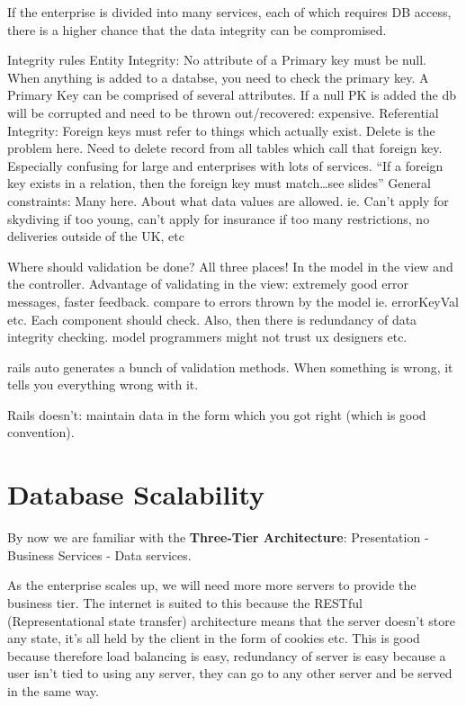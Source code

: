 \documentclass[11pt]{article}
\begin{document}
If the enterprise is divided into many services, each of which requires DB access, there is a higher chance that the data integrity can be compromised.

Integrity rules
Entity Integrity: No attribute of a Primary key must be null. When anything is added to a databse, you need to check the primary key. A Primary Key can be comprised of several attributes. If a null PK is added the db will be corrupted and need to be thrown out/recovered: expensive.
Referential Integrity: Foreign keys must refer to things which actually exist. Delete is the problem here. Need to delete record from all tables which call that foreign key. Especially confusing for large and enterprises with lots of services. “If a foreign key exists in a relation, then the foreign key must match…see slides”
General constraints: Many here. About what data values are allowed. ie. Can’t apply for skydiving if too young, can’t apply for insurance if too many restrictions, no deliveries outside of the UK, etc

Where should validation be done?
All three places! In the model in the view and the controller. Advantage of validating in the view: extremely good error messages, faster feedback. compare to errors thrown by the model ie. errorKeyVal etc. Each component should check. Also, then there is redundancy of data integrity checking. model programmers might not trust ux designers etc.

rails auto generates a bunch of validation methods. When something is wrong, it tells you everything wrong with it.

Rails doesn’t: maintain data in the form  which you got right (which is good convention).

\section{Database Scalability}

By now we are familiar with the \textbf{Three-Tier Architecture}: Presentation - Business Services - Data services.

As the enterprise scales up, we will need more more servers to provide the business tier. The internet is suited to this because the RESTful (Representational state transfer) architecture means that the server doesn’t store any state, it’s all held by the client in the form of cookies etc. This is good because therefore load balancing is easy, redundancy of server is easy because a user isn’t tied to using any server, they can go to any other server and be served in the same way.
\end{document}
